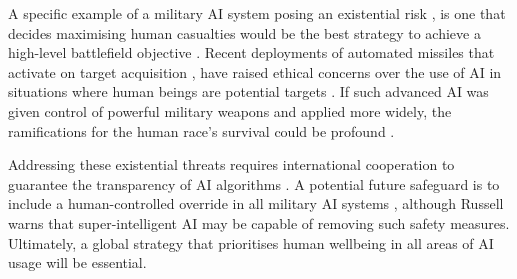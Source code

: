 \documentclass[a4paper, 11pt]{article}
\begin{document}
A specific example of a military AI system posing an existential risk \cite{yampolskiy2016, Cummings2017}, 
is one that decides maximising human casualties would be the best strategy to achieve a high-level battlefield objective \cite{Barrat2013}. 
Recent deployments of automated missiles that activate on target acquisition \cite{Atherton2021, BodeWatts2023}, 
have raised ethical concerns over the use of AI in situations where human beings are potential targets \cite{Emery2021}. 
If such advanced AI was given control of powerful military weapons and applied more widely, 
the ramifications for the human race's survival could be profound \cite{Tegmark2017}. 

Addressing these existential threats requires international cooperation 
to guarantee the transparency of AI algorithms \cite{Cihon2019, Leslie2019}. 
A potential future safeguard is to include a human-controlled override in all military AI systems \cite{CritchKrueger2020}, 
although Russell \cite{Russell2019} warns that super-intelligent AI may be capable of removing such safety measures. 
Ultimately, a global strategy that prioritises human wellbeing in all areas of AI usage will be essential.

\printbibliography
\end{document}
